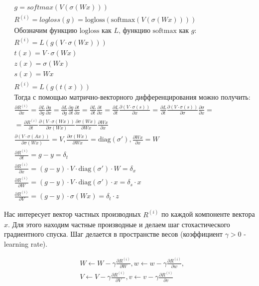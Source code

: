 \documentclass{report}
\begin{document}
\begin{align*}
& g = softmax(V(\sigma(Wx))) \\
& R^{(i)} = logloss(g) = \text{logloss}(\text{softmax}(V(\sigma(Wx)))) \\
& \text{Обозначим функцию logloss как } L \text{, функцию softmax как } g \text{:} \\
& R^{(i)} = L(g(V \cdot \sigma(Wx))) \\
& t(x) = V \cdot \sigma(Wx) \\
& z(x) = \sigma(Wx) \\
& s(x) = Wx \\
& R^{(i)} = L(g(t(x))) \\
& \text{Тогда с помощью матрично-векторного дифференцирования можно получить:} \\
& \frac{\partial R^{(i)}}{\partial x} = \frac{\partial L}{\partial g} \frac{\partial g}{\partial x} = \frac{\partial L}{\partial g} \frac{\partial g}{\partial t} \frac{\partial t}{\partial x} = \frac{\partial L}{\partial t} \frac{\partial t}{\partial x} = \frac{\partial L}{\partial t} \frac{\partial (V \cdot \sigma(s))}{\partial x} = \frac{\partial L}{\partial t} \frac{\partial (V \cdot \sigma(s))}{\partial \sigma} \frac{\partial \sigma}{\partial x} = \\
& = \frac{\partial R^{(i)}}{\partial t} \frac{\partial (V \cdot \sigma(Wx))}{\partial \sigma(Wx)} \frac{\partial \sigma(Wx)}{\partial Wx} \frac{\partial Wx}{\partial x} \\
& \frac{\partial (V \cdot \sigma(Ax))}{\partial \sigma(Wx)} = V,
  \frac{\partial \sigma(Wx)}{\partial Wx} = \text{diag}(\sigma'),
  \frac{\partial Wx}{\partial x} = W \\
& \frac{\partial R^{(i)}}{\partial t} = g - y = \delta_t \\
& \frac{\partial R^{(i)}}{\partial x} = (g - y) \cdot V \cdot \text{diag}(\sigma') \cdot W = \delta_x \\
& \frac{\partial R^{(i)}}{\partial W} = (g - y) \cdot V \cdot \text{diag}(\sigma') \cdot x = \delta_s \cdot x \\
& \frac{\partial R^{(i)}}{\partial V} = (g - y) \cdot \sigma(Wx) = \delta_t \cdot z
\end{align*}

\par Нас интересует вектор частных производных $R^{(i)}$ по каждой компоненте вектора $x$. Для этого находим частные производные и делаем шаг стохастического градиентного спуска. Шаг делается в пространстве весов (коэффициент $\gamma > 0$ - learning rate).

\begin{align*}
& W \leftarrow W - \gamma \frac{\partial R^{(i)}}{\partial W}, w \leftarrow w - \gamma \frac{\partial R^{(i)}}{\partial w}, \\
& V \leftarrow V - \gamma \frac{\partial R^{(i)}}{\partial V}, v \leftarrow v - \gamma \frac{\partial R^{(i)}}{\partial v} \\
\end{align*}
\end{document}
